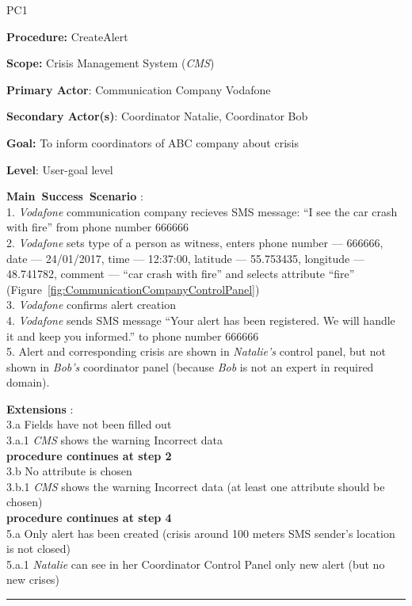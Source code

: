 \begin{lyxlist}{PC1}
\small{
\item [\textbf{Procedure:}] CreateAlert
\item [\textbf{Scope:}] Crisis Management System (\emph{CMS})
\item [\textbf{Primary Actor}:] Communication Company Vodafone
\item [\textbf{Secondary Actor(s)}:] Coordinator Natalie, Coordinator Bob
\item [\textbf{Goal:}] To inform coordinators of ABC company about crisis
\item [\textbf{Level}:] User-goal level

\item [\textbf{Main~Success~Scenario}]:\\
1. \emph{Vodafone} communication company recieves SMS message: ``I see the car crash
with fire'' from phone number 666666\\
2. \emph{Vodafone} sets type of a person as witness, enters phone
number --- 666666, date --- 24/01/2017, time --- 12:37:00, latitude
\hspace*{0.4cm} --- 55.753435, longitude --- 48.741782, comment --- ``car crash
with fire'' and selects attribute ``fire'' (Figure~\ref{fig:CommunicationCompanyControlPanel})\\
3. \emph{Vodafone} confirms alert creation\\
4. \emph{Vodafone} sends SMS message ``Your alert has been registered.
We will handle it and keep you informed.'' to phone number \hspace*{0.4cm}
666666\\
5. Alert and corresponding crisis are shown in \emph{Natalie's} control panel,
but not shown in \emph{Bob’s} coordinator panel (because
\hspace*{0.4cm} \emph{Bob} is not an expert in required domain).

\item [\textbf{Extensions}]:\\
3.a Fields have not been filled out\\
	\hspace*{0.5cm} 3.a.1 \emph{CMS} shows the warning Incorrect data\\
	\hspace*{0.5cm} \textbf{procedure continues at step 2}\\
3.b No attribute is chosen\\
	\hspace*{0.5cm} 3.b.1 \emph{CMS} shows the warning Incorrect data 
	(at least one attribute should be chosen)\\
	\hspace*{0.5cm} \textbf{procedure continues at step 4}\\
5.a Only alert has been created (crisis around 100 meters SMS sender's location
is not closed)\\
	\hspace*{0.5cm} 5.a.1 \emph{Natalie} can see in her Coordinator Control Panel
	only new alert (but no new crises)\\
}
\end{lyxlist}
\hrule
\vspace{0.5cm}


